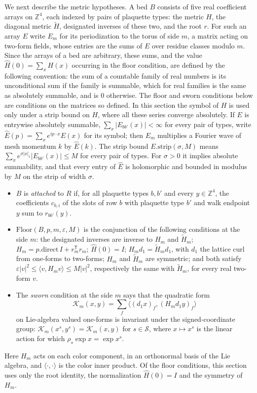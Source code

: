 We next describe the metric hypotheses. A bed $B$ consists of five real
coefficient arrays on $\mathbb Z^4$, each indexed by pairs of plaquette
types: the metric $H$, the diagonal metric $\widetilde H$, designated
inverses of these two, and the root $r$. For such an array $E$ write
$E_m$ for its periodization to the torus of side $m$, a matrix acting
on two-form fields, whose entries are the sums of $E$ over residue
classes modulo $m$. Since the arrays of a bed are arbitrary, these
sums, and the value $\widehat H(0)=\sum_xH(x)$ occurring in the floor
condition, are defined by the following convention: the sum of
a countable family of real numbers is its unconditional sum if the
family is summable, which for real families is the same as absolutely
summable, and is $0$ otherwise. The floor and sworn conditions below
are conditions on the matrices so defined. In this section the symbol
of $H$ is used only under a strip bound on $H$, where all these series
converge absolutely. If $E$ is entrywise absolutely
summable, $\sum_x|E_{bb'}(x)|<\infty$ for every pair of types, write
$\widehat E(p)=\sum_xe^{ip\cdot x}E(x)$ for its symbol; then $E_m$
multiplies a Fourier wave of mesh momentum $k$ by $\widehat E(k)$.
The strip bound $E.\mathrm{strip}(\sigma,M)$ means
$\sum_xe^{\sigma|x|_1}|E_{bb'}(x)|\leq M$ for every pair of types. For
$\sigma>0$ it implies absolute summability, and that every entry of
$\widehat E$ is holomorphic and bounded in modulus by $M$ on the strip
of width $\sigma$.
\begin{itemize}
\item $B$ is \emph{attached} to $R$ if, for all plaquette types $b,b'$
 and every $y\in\mathbb Z^4$, the coefficients $c_{b,i}$ of the slots
 of row $b$ with plaquette type $b'$ and walk endpoint $y$ sum to
 $r_{bb'}(y)$.
\item $\mathrm{Floor}(B,p,m,\varepsilon,M)$ is the conjunction of the
 following conditions at the side $m$: the designated inverses are
 inverse to $H_m$ and $\widetilde H_m$;
 $H_m=p.\mathrm{direct}\,I+r_m^{\mathsf T}r_m$; $\widehat H(0)=I$;
 $H_md_1=\widetilde H_md_1$, with $d_1$ the lattice curl from one-forms
 to two-forms; $H_m$ and $\widetilde H_m$ are symmetric; and both
 satisfy $\varepsilon|v|^2\leq\langle v,H_mv\rangle\leq M|v|^2$,
 respectively the same with $\widetilde H_m$, for every real two-form
 $v$.
\item The \emph{sworn} condition at the side $m$ says that the
 quadratic form
 \[
  \mathcal K_m(x,y)=\sum_f\langle(d_1x)_f,(H_md_1y)_f\rangle
 \]
 on Lie-algebra valued one-forms is invariant under the
 signed-coordinate group: $\mathcal K_m(x^s,y^s)=\mathcal K_m(x,y)$
 for $s\in\mathcal S$, where $x\mapsto x^s$ is the linear action for
 which $\rho_s\exp x=\exp x^s$.
\end{itemize}
Here $H_m$ acts on each color component, in an orthonormal basis of the
Lie algebra, and $\langle\cdot,\cdot\rangle$ is the color inner
product. Of the floor conditions, this section uses only the root
identity, the normalization $\widehat H(0)=I$ and the symmetry of
$H_m$.


